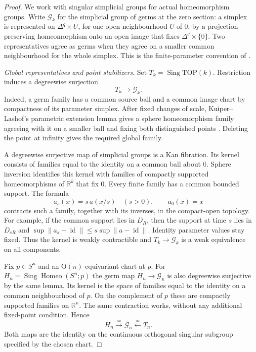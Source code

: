 \begin{proof}
We work with singular simplicial groups for actual homeomorphism
groups.  Write $\mathcal G_k$ for the simplicial group of germs at
the zero section: a simplex is represented on
$\Delta^q\times U$, for one open neighbourhood $U$ of $0$, by a
projection-preserving homeomorphism onto an open image that fixes
$\Delta^q\times\{0\}$.  Two representatives agree as germs when
they agree on a smaller common neighbourhood for the whole simplex.
This is the finite-parameter convention of
\cite[Section~3.4, equations~(3.5)--(3.7), pp.~14--15]
{SalvatoreTurchin2026}.

\medskip\noindent\textit{Global representatives and point stabilizers.}
Set $T_k=\operatorname{Sing}\mathrm{TOP}(k)$.  Restriction induces
a degreewise surjection
\[
                     T_k\longrightarrow\mathcal G_k.
\]
Indeed, a germ family has a common source ball and a common image
chart by compactness of its parameter simplex.  After fixed changes
of scale, Kuiper--Lashof's parametric extension lemma gives a
sphere homeomorphism family agreeing with it on a smaller ball and
fixing both distinguished points
\cite[Lemma~3, p.~11; TOP proof, pp.~12--13]{KuiperLashof1966I}.
Deleting the point at infinity gives the required global family.

A degreewise surjective map of simplicial groups is a Kan fibration.
Its kernel consists of families equal to the identity on a common
ball about $0$.  Sphere inversion identifies this kernel with
families of compactly supported homeomorphisms of $\mathbb R^k$
that fix $0$.  Every finite family has a common bounded support.
The formula
\[
 a_s(x)=s\,a(x/s)\quad(s>0),\qquad a_0(x)=x
\]
contracts such a family, together with its inverses, in the
compact-open topology.  For example, if the common support lies
in $D_R$, then the support at time $s$ lies in $D_{sR}$ and
$\sup\|a_s-\operatorname{id}\|\leq
s\sup\|a-\operatorname{id}\|$.  Identity parameter values stay
fixed.  Thus the kernel is weakly contractible and
$T_k\to\mathcal G_k$ is a weak equivalence on all components.

Fix $p\in S^n$ and an $\mathrm O(n)$-equivariant chart at $p$.
For $H_n=\operatorname{Sing}\operatorname{Homeo}(S^n;p)$ the
germ map $H_n\to\mathcal G_n$ is also degreewise surjective by
the same lemma.  Its kernel is the space of families equal to the
identity on a common neighbourhood of $p$.  On the complement of
$p$ these are compactly supported families on $\mathbb R^n$.
The same contraction works, without any additional fixed-point
condition.  Hence
\begin{equation}\label{eq:sphere-stabilizer-germ-equivalence}
 H_n\xrightarrow{\simeq}\mathcal G_n
                 \xleftarrow{\simeq}T_n.
\end{equation}
Both maps are the identity on the continuous orthogonal singular
subgroup specified by the chosen chart.


\end{proof}
